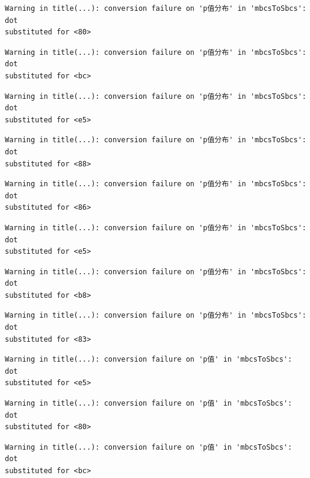 \documentclass[
  letterpaper,
  DIV=11,
  numbers=noendperiod]{scrreprt}
\begin{document}
\begin{verbatim}
Warning in title(...): conversion failure on 'p值分布' in 'mbcsToSbcs': dot
substituted for <80>
\end{verbatim}

\begin{verbatim}
Warning in title(...): conversion failure on 'p值分布' in 'mbcsToSbcs': dot
substituted for <bc>
\end{verbatim}

\begin{verbatim}
Warning in title(...): conversion failure on 'p值分布' in 'mbcsToSbcs': dot
substituted for <e5>
\end{verbatim}

\begin{verbatim}
Warning in title(...): conversion failure on 'p值分布' in 'mbcsToSbcs': dot
substituted for <88>
\end{verbatim}

\begin{verbatim}
Warning in title(...): conversion failure on 'p值分布' in 'mbcsToSbcs': dot
substituted for <86>
\end{verbatim}

\begin{verbatim}
Warning in title(...): conversion failure on 'p值分布' in 'mbcsToSbcs': dot
substituted for <e5>
\end{verbatim}

\begin{verbatim}
Warning in title(...): conversion failure on 'p值分布' in 'mbcsToSbcs': dot
substituted for <b8>
\end{verbatim}

\begin{verbatim}
Warning in title(...): conversion failure on 'p值分布' in 'mbcsToSbcs': dot
substituted for <83>
\end{verbatim}

\begin{verbatim}
Warning in title(...): conversion failure on 'p值' in 'mbcsToSbcs': dot
substituted for <e5>
\end{verbatim}

\begin{verbatim}
Warning in title(...): conversion failure on 'p值' in 'mbcsToSbcs': dot
substituted for <80>
\end{verbatim}

\begin{verbatim}
Warning in title(...): conversion failure on 'p值' in 'mbcsToSbcs': dot
substituted for <bc>
\end{verbatim}
\end{document}
